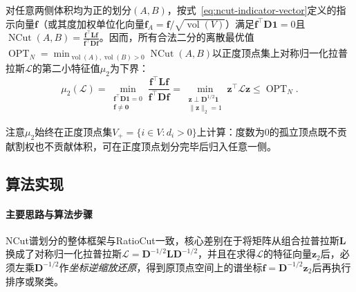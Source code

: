 \begin{theorem}[NCut的度加权二次型表示与谱松弛下界]
\label{prop:graph-ncut-relaxation}
对任意两侧体积均为正的划分$(A,B)$，按式~\eqref{eq:ncut-indicator-vector}定义的指示向量$\bm f$（或其度加权单位化向量$\bm f_A=\bm f/\sqrt{\operatorname{vol}(V)}$）满足$\bm f^\top\bm D\bm 1=0$且$\operatorname{NCut}(A,B)=\frac{\bm f^\top\bm L\bm f}{\bm f^\top\bm D\bm f}$。因而，所有合法二分的离散最优值$\operatorname{OPT}_N=\min_{\operatorname{vol}(A),\operatorname{vol}(B)>0}\operatorname{NCut}(A,B)$以正度顶点集上对称归一化拉普拉斯$\mathcal L$的第二小特征值$\mu_2$为下界：
\[
  \mu_2(\mathcal L)
  = \min_{\substack{\bm f^\top\bm D\bm 1=0\\\bm f\neq\bm 0}}\frac{\bm f^\top\bm L\bm f}{\bm f^\top\bm D\bm f}
  = \min_{\substack{\bm z\perp\bm D^{1/2}\bm 1\\\lVert\bm z\rVert_2=1}}\bm z^\top\mathcal L\bm z
  \leq \operatorname{OPT}_N.
\]
\end{theorem}

注意$\mu_2$始终在正度顶点集$V_+=\{i\in V:d_i>0\}$上计算：度数为$0$的孤立顶点既不贡献割权也不贡献体积，可在正度顶点划分完毕后归入任意一侧。

\subsection{算法实现}
\label{sec:graph-ncut-sweep}

\paragraph{主要思路与算法步骤}

NCut谱划分的整体框架与RatioCut一致，核心差别在于将矩阵从组合拉普拉斯$\bm L$换成了对称归一化拉普拉斯$\mathcal L=\bm D^{-1/2}\bm L\bm D^{-1/2}$，并且在求得$\mathcal L$的特征向量$\bm z_2$后，必须左乘$\bm D^{-1/2}$作\emph{坐标逆缩放还原}，得到原顶点空间上的谱坐标$\bm f=\bm D^{-1/2}\bm z_2$后再执行排序或聚类。

